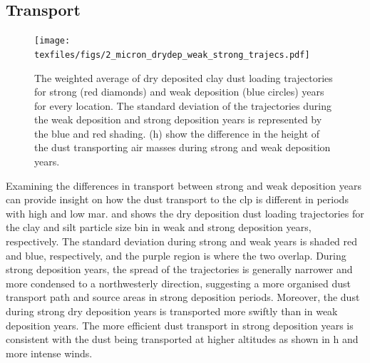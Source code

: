 \subsection{Transport}
\begin{figure}[htbp]
    \centering
    \texttt{[image: texfiles/figs/2\_micron\_drydep\_weak\_strong\_trajecs.pdf]}
    \caption{The weighted average of dry deposited clay dust loading trajectories for strong (red diamonds) and weak deposition (blue circles) years for every location. The standard deviation of the trajectories during the weak deposition and strong deposition years is represented by the blue and red shading.  (h) show the difference in the height of the dust transporting air masses during strong and weak deposition years. }
    \label{fig:strong_weak_drydepo_year_2mmu_trajecs}
\end{figure}

Examining the differences in transport between strong and weak deposition years can provide insight on how the dust transport to the \acrshort{clp} is different in periods with high and low \acrshort{mar}. 
 and  shows the dry deposition dust loading trajectories for the clay and silt particle size bin in weak and strong deposition years, respectively. 
The standard deviation during strong and weak years is shaded red and blue, respectively, and the purple region is where the two overlap. 
During strong deposition years, the spread of the trajectories is generally narrower and more condensed to a northwesterly direction,
suggesting a more organised dust transport path and source areas in strong deposition periods.   
Moreover, the dust during strong dry deposition years is transported more swiftly than in weak deposition years. 
The more efficient dust transport in strong deposition years is consistent with the dust being transported at higher altitudes as shown in h and more intense winds.


